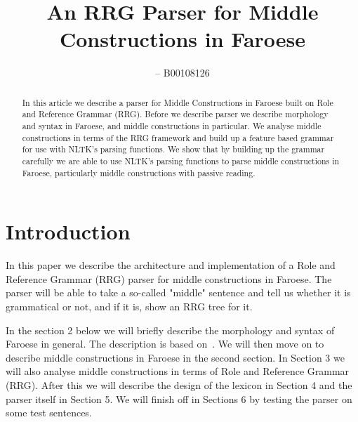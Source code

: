 \documentclass[12pt,%
]{lin-v2/lin}
\begin{document}
    
\leftrunning{}  %

\rightrunning{} %

\title{An RRG Parser for Middle Constructions in Faroese}

\author[1]{  -- B00108126}

\address[1]
{%
  , %
  , %
  , %
}

\maketitle

\begin{abstract}
    In this article we describe a parser for Middle Constructions
    in Faroese built on Role and Reference Grammar (RRG). Before we describe parser we
    describe morphology and syntax in Faroese, and middle constructions in particular.
    We analyse middle constructions in terms of the RRG framework and build up a feature
    based grammar for use with NLTK's parsing functions. We show that by building up the
    grammar carefully we are able to use NLTK's parsing functions to parse middle constructions
    in Faroese, particularly middle constructions with passive reading.
\end{abstract}


\section{Introduction}

In this paper we describe the architecture and implementation of a Role and Reference Grammar (RRG)
parser for middle constructions in Faroese. The parser will be able to take a so-called "middle"
sentence and tell us whether it is grammatical or not, and if it is, show an RRG tree for it.

In the section 2 below we will briefly describe the morphology
and syntax of Faroese in general. The description is based on~\citep{faroese}.
We will then move on to describe middle constructions in Faroese in the second section.
In Section 3 we will also analyse middle constructions in terms of
Role and Reference Grammar (RRG). After this we will 
describe the design of the lexicon in Section 4 and the parser itself in Section 5.
We will finish off in Sections 6 by testing the parser on some test sentences.
\end{document}
